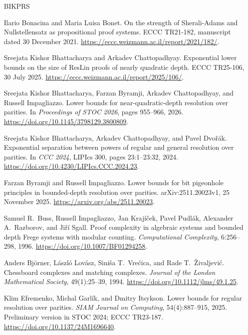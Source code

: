 \begin{thebibliography}{BIKPRS}

Ilario Bonacina and Maria Luisa Bonet.
\newblock On the strength of Sherali-Adams and Nullstellensatz as
propositional proof systems.
\newblock ECCC TR21-182, manuscript dated 30 December 2021.
\newblock \url{https://eccc.weizmann.ac.il/report/2021/182/}.

Sreejata Kishor Bhattacharya and Arkadev Chattopadhyay.
\newblock Exponential lower bounds on the size of ResLin proofs of nearly
quadratic depth.
\newblock ECCC TR25-106, 30 July 2025.
\newblock \url{https://eccc.weizmann.ac.il/report/2025/106/}.

Sreejata Kishor Bhattacharya, Farzan Byramji, Arkadev Chattopadhyay,
and Russell Impagliazzo.
\newblock Lower bounds for near-quadratic-depth resolution over parities.
\newblock In \emph{Proceedings of STOC 2026}, pages 955--966, 2026.
\newblock \url{https://doi.org/10.1145/3798129.3800809}.

Sreejata Kishor Bhattacharya, Arkadev Chattopadhyay, and Pavel Dvo\v{r}\'ak.
\newblock Exponential separation between powers of regular and general
resolution over parities.
\newblock In \emph{CCC 2024}, LIPIcs 300, pages 23:1--23:32, 2024.
\newblock \url{https://doi.org/10.4230/LIPIcs.CCC.2024.23}.

Farzan Byramji and Russell Impagliazzo.
\newblock Lower bounds for bit pigeonhole principles in bounded-depth
resolution over parities.
\newblock arXiv:2511.20023v1, 25 November 2025.
\newblock \url{https://arxiv.org/abs/2511.20023}.

Samuel R.~Buss, Russell Impagliazzo, Jan Kraj\'i\v{c}ek,
Pavel Pudl\'ak, Alexander A.~Razborov, and Ji\v{r}\'i Sgall.
\newblock Proof complexity in algebraic systems and bounded depth Frege
systems with modular counting.
\newblock \emph{Computational Complexity}, 6:256--298, 1996.
\newblock \url{https://doi.org/10.1007/BF01294258}.

Anders Bj\"orner, L\'aszl\'o Lov\'asz, Sini\v{s}a T.~Vre\'cica,
and Rade T.~\v{Z}ivaljevi\'c.
\newblock Chessboard complexes and matching complexes.
\newblock \emph{Journal of the London Mathematical Society},
49(1):25--39, 1994.
\newblock \url{https://doi.org/10.1112/jlms/49.1.25}.

Klim Efremenko, Michal Garl\'ik, and Dmitry Itsykson.
\newblock Lower bounds for regular resolution over parities.
\newblock \emph{SIAM Journal on Computing}, 54(4):887--915, 2025.
\newblock Preliminary version in STOC 2024; ECCC TR23-187.
\newblock \url{https://doi.org/10.1137/24M1696640}.


\end{thebibliography}
